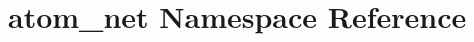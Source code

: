 \hypertarget{namespaceatom__net}{\section{atom\-\_\-net Namespace Reference}
\label{namespaceatom__net}
}
